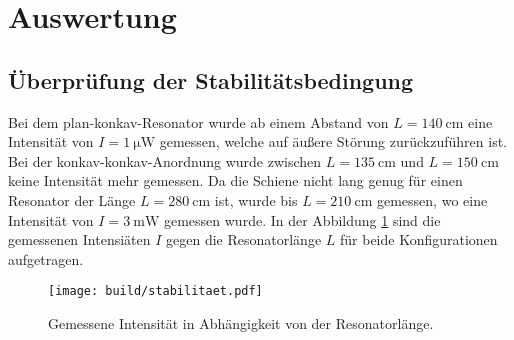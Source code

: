 \section{Auswertung}
\label{sec:Auswertung}
\subsection{Überprüfung der Stabilitätsbedingung}
\label{subsec:stabilitaet}
Bei dem plan-konkav-Resonator wurde ab einem Abstand von $L = \qty{140}{\centi\metre}$ eine Intensität von  $I = \qty{1}{\micro\watt}$ gemessen, welche auf 
äußere Störung zurückzuführen ist.
Bei der konkav-konkav-Anordnung wurde zwischen $L = \qty{135}{\centi\metre}$ und $L = \qty{150}{\centi\metre}$ keine Intensität mehr gemessen. Da die Schiene
nicht lang genug für einen Resonator der Länge $L = \qty{280}{\centi\metre}$ ist, wurde bis $L = \qty{210}{\centi\metre}$ gemessen, wo eine 
Intensität von $I = \qty{3}{\milli\watt}$ gemessen wurde.
In der Abbildung \ref{fig:stabilitaet} sind die gemessenen Intensiäten $I$ gegen die Resonatorlänge $L$ für beide Konfigurationen aufgetragen.
\begin{figure}
    \centering
    \texttt{[image: build/stabilitaet.pdf]}
    \caption{Gemessene Intensität in Abhängigkeit von der Resonatorlänge.}
    \label{fig:stabilitaet}
\end{figure}
\FloatBarrier
